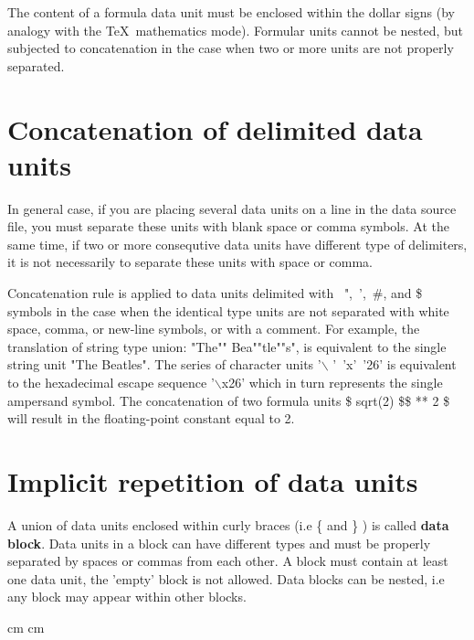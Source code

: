 The content of a formula data unit must be enclosed within the dollar signs
(by analogy with the \TeX\  mathematics mode).
Formular units cannot be nested, but subjected to concatenation
in the case when two or more units are not properly separated.

\section{Concatenation of delimited data units}

In general case, 
if you are placing several data units on a line in the data source file,
you must separate these units with blank space or comma symbols.
At the same time, if two or more consequtive data units have
different type of delimiters, 
it is not necessarily to separate these units
with space or comma.

Concatenation rule is applied to data units delimited with
\ ",\ ',\ \#, and \$ symbols in the case when the identical type units
are not separated with  white space, comma, or new-line symbols,
or with a comment.
For example,
the translation of string type union: "The"" Bea""tle""s",
is equivalent to the single string unit "The Beatles".
The series of character units '$\backslash$ '\ 'x'\ '26' is equivalent to 
the hexadecimal escape sequence '$\backslash$x26'
which in turn represents the single ampersand symbol.
The concatenation of two formula units \$ sqrt(2) \$\$ ** 2 \$
will result in the floating-point constant equal to 2.

\section{Implicit repetition of data units}

A union of data units enclosed within curly braces (i.e \{ and \} )
is called {\bf data block}. Data units in a block can have different types
and must be properly separated by spaces or commas from each other.
A block must contain at least one data unit, 
the 'empty' block is not allowed.
Data blocks can be nested, i.e any block may appear within other blocks.

 cm
 cm



